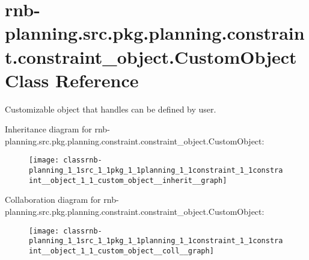 \hypertarget{classrnb-planning_1_1src_1_1pkg_1_1planning_1_1constraint_1_1constraint__object_1_1_custom_object}{}\section{rnb-\/planning.src.\+pkg.\+planning.\+constraint.\+constraint\+\_\+object.\+Custom\+Object Class Reference}
\label{classrnb-planning_1_1src_1_1pkg_1_1planning_1_1constraint_1_1constraint__object_1_1_custom_object}


Customizable object that handles can be defined by user.  




Inheritance diagram for rnb-\/planning.src.\+pkg.\+planning.\+constraint.\+constraint\+\_\+object.\+Custom\+Object\+:
\nopagebreak
\begin{figure}[H]
\begin{center}
\leavevmode
\texttt{[image: classrnb-planning\_1\_1src\_1\_1pkg\_1\_1planning\_1\_1constraint\_1\_1constraint\_\_object\_1\_1\_custom\_object\_\_inherit\_\_graph]}
\end{center}
\end{figure}


Collaboration diagram for rnb-\/planning.src.\+pkg.\+planning.\+constraint.\+constraint\+\_\+object.\+Custom\+Object\+:
\nopagebreak
\begin{figure}[H]
\begin{center}
\leavevmode
\texttt{[image: classrnb-planning\_1\_1src\_1\_1pkg\_1\_1planning\_1\_1constraint\_1\_1constraint\_\_object\_1\_1\_custom\_object\_\_coll\_\_graph]}
\end{center}
\end{figure}
